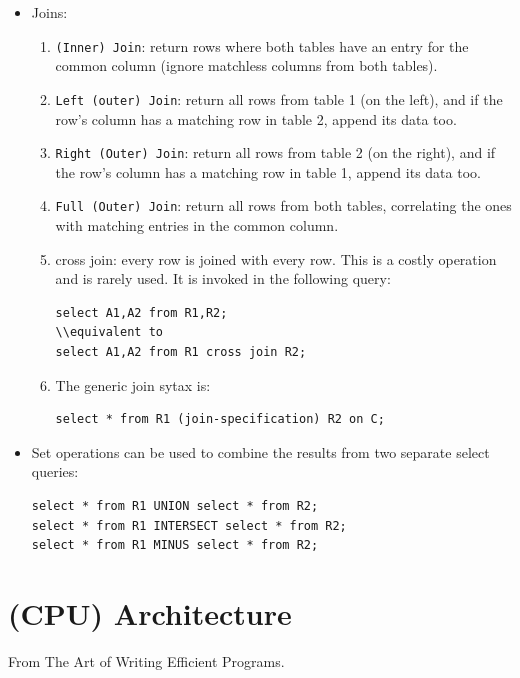 \documentclass{report}
\begin{document}
\begin{itemize}
\item Joins:
\begin{enumerate}
\item \texttt{(Inner) Join}: return rows where both tables have an entry for the common column (ignore matchless columns from both tables).
\item \texttt{Left (outer) Join}: return all rows from table 1 (on the left), and if the row's column has a matching row in table 2, append its data too. 
\item \texttt{Right (Outer) Join}: return all rows from table 2 (on the right), and if the row's column has a matching row in table 1, append its data too.  
\item \texttt{Full (Outer) Join}: return all rows from both tables, correlating the ones with matching entries in the common column. 
\item cross join: every row is joined with every row. This is a costly operation and is rarely used. It is invoked in the following query:
\begin{lstlisting}
select A1,A2 from R1,R2;
\\equivalent to
select A1,A2 from R1 cross join R2;
\end{lstlisting}
\item The generic join sytax is:
\begin{lstlisting}
select * from R1 (join-specification) R2 on C;
\end{lstlisting}
\end{enumerate}
\item Set operations can be used to combine the results from two separate select queries:
\begin{lstlisting}[caption=Set Operation]
select * from R1 UNION select * from R2;
select * from R1 INTERSECT select * from R2;
select * from R1 MINUS select * from R2;
\end{lstlisting}
\end{itemize}
\chapter{(CPU) Architecture}
From The Art of Writing Efficient Programs.
\end{document}

